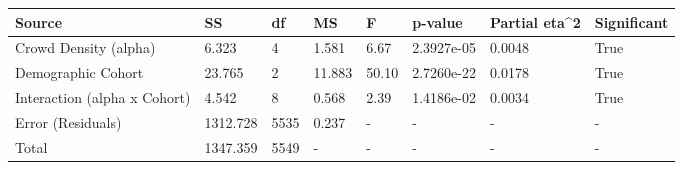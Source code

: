 \begin{tabular}{llllllll}
\hline
Source & SS & df & MS & F & p-value & Partial eta^2 & Significant \\ \hline
Crowd Density (alpha) & 6.323 & 4 & 1.581 & 6.67 & 2.3927e-05 & 0.0048 & True \\
Demographic Cohort & 23.765 & 2 & 11.883 & 50.10 & 2.7260e-22 & 0.0178 & True \\
Interaction (alpha x Cohort) & 4.542 & 8 & 0.568 & 2.39 & 1.4186e-02 & 0.0034 & True \\
Error (Residuals) & 1312.728 & 5535 & 0.237 & - & - & - & - \\
Total & 1347.359 & 5549 & - & - & - & - & - \\
\hline
\end{tabular}
